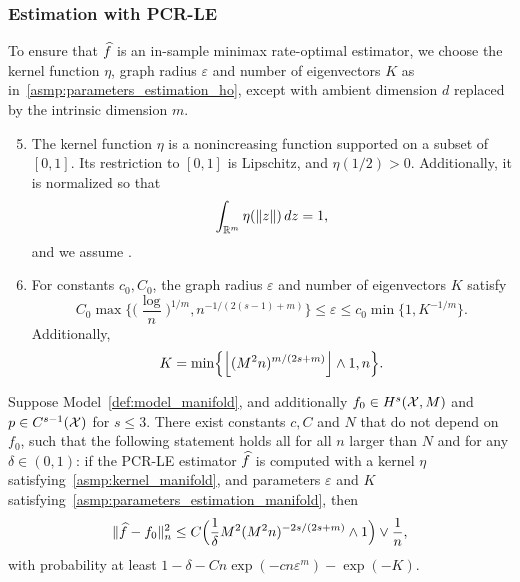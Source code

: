 \subsubsection{Estimation with PCR-LE} 
To ensure that $\widehat{f}$ is an in-sample minimax rate-optimal estimator, we choose the kernel function $\eta$, graph radius $\varepsilon$ and number of eigenvectors $K$ as in~\ref{asmp:parameters_estimation_ho}, except with ambient dimension $d$ replaced by the intrinsic dimension $m$.

\begin{enumerate}[label=(P\arabic*)]
	\setcounter{enumi}{4}
	\item 
	\label{asmp:kernel_manifold}
	The kernel function $\eta$ is a nonincreasing function supported on a subset of $[0,1]$. Its restriction to $[0,1]$ is Lipschitz, and $\eta(1/2) > 0$. Additionally, it is normalized so that
	\begin{equation*}
	\int_{\mathbb{R}^m} \eta(\|z\|) \,dz = 1,
	\end{equation*}
	and we assume .
	\item 
	\label{asmp:parameters_estimation_manifold}
	For constants $c_0,C_0$, the graph radius $\varepsilon$ and number of eigenvectors $K$ satisfy
	\begin{equation}
	\label{eqn:radius_estimation_manifold}
	C_0\max\biggl\{\biggl(\frac{\log}{n}\biggr)^{1/m}, n^{-1/(2(s - 1) + m)}\biggr\} \leq \varepsilon \leq c_0\min\{1, K^{-1/m}\}.
	\end{equation}
	Additionally,
	\begin{equation*}
	K = \min\Bigl\{\left\lfloor (M^2n)^{m/(2s + m)} \right\rfloor \wedge 1,n \Bigr\}.
	\end{equation*}
\end{enumerate}

\begin{theorem}
	\label{thm:laplacian_eigenmaps_estimation_manifold}
	Suppose Model~\ref{def:model_manifold}, and additionally $f_0 \in H^s(\mathcal{X},M)$ and $p \in C^{s - 1}(\mathcal{X})$ for $s \leq 3$. There exist constants $c,C$ and $N$ that do not depend on $f_0$, such that the following statement holds all for all $n$ larger than $N$ and for any $\delta \in (0,1)$: if the PCR-LE estimator $\widehat{f}$ is computed with a kernel $\eta$ satisfying~\ref{asmp:kernel_manifold}, and parameters $\varepsilon$ and $K$ satisfying~\ref{asmp:parameters_estimation_manifold}, then
	\begin{equation}
	\label{eqn:laplacian_eigenmaps_estimation_manifold}
	\|\widehat{f} - f_0\|_n^2 \leq C\Bigl(\frac{1}{\delta}M^2(M^2n)^{-2s/(2s + m)} \wedge 1\Bigr) \vee \frac{1}{n},
	\end{equation}
	with probability at least $1 - \delta - Cn\exp(-cn\varepsilon^m) - \exp(-K)$.
\end{theorem}

